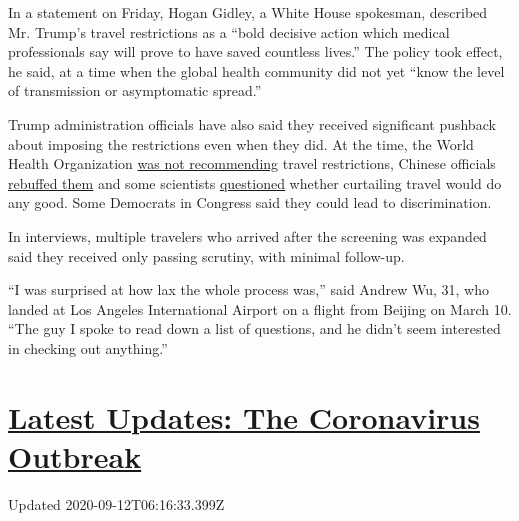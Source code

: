In a statement on Friday, Hogan Gidley, a White House spokesman,
described Mr. Trump's travel restrictions as a ``bold decisive action
which medical professionals say will prove to have saved countless
lives.'' The policy took effect, he said, at a time when the global
health community did not yet ``know the level of transmission or
asymptomatic spread.''

Trump administration officials have also said they received significant
pushback about imposing the restrictions even when they did. At the
time, the World Health Organization
\href{https://www.who.int/news-room/detail/30-01-2020-statement-on-the-second-meeting-of-the-international-health-regulations-(2005)-emergency-committee-regarding-the-outbreak-of-novel-coronavirus-(2019-ncov)}{was
not recommending} travel restrictions, Chinese officials
\href{https://www.fmprc.gov.cn/mfa_eng/xwfw_665399/s2510_665401/2511_665403/t1739548.shtml}{rebuffed
them} and some scientists
\href{https://www.nytimes3xbfgragh.onion/2020/01/31/business/china-travel-coronavirus.html}{questioned}
whether curtailing travel would do any good. Some Democrats in Congress
said they could lead to discrimination.

In interviews, multiple travelers who arrived after the screening was
expanded said they received only passing scrutiny, with minimal
follow-up.

``I was surprised at how lax the whole process was,'' said Andrew Wu,
31, who landed at Los Angeles International Airport on a flight from
Beijing on March 10. ``The guy I spoke to read down a list of questions,
and he didn't seem interested in checking out anything.''

\hypertarget{latest-updates-the-coronavirus-outbreak}{%
\section{\texorpdfstring{\href{https://www.nytimes3xbfgragh.onion/2020/09/11/world/covid-19-coronavirus.html?action=click\&pgtype=Article\&state=default\&region=MAIN_CONTENT_1\&context=storylines_live_updates}{Latest
Updates: The Coronavirus
Outbreak}}{Latest Updates: The Coronavirus Outbreak}}\label{latest-updates-the-coronavirus-outbreak}}

Updated 2020-09-12T06:16:33.399Z

